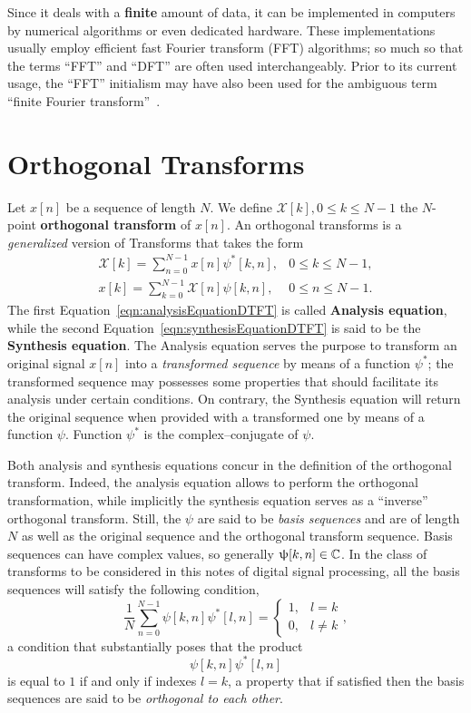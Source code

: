 \documentclass[\documentfontsize, twocolumn]{\classname}
\begin{document}
Since it deals with a \textbf{finite} amount of data, it can be implemented in computers by numerical algorithms or even dedicated hardware. These implementations usually employ efficient fast Fourier transform (FFT) algorithms; so much so that the terms ``FFT'' and ``DFT'' are often used interchangeably. Prior to its current usage, the ``FFT'' initialism may have also been used for the ambiguous term ``finite Fourier transform''~\cite{bib:discreteFourierTransform}.

\section{Orthogonal Transforms}\label{sec:orthogonalTransforms}

Let $x[n]$ be a sequence of length $N$. We define $\mathcal X[k], 0 \leq k \leq N-1$ the $N$-point \textbf{orthogonal transform} of $x[n]$. An orthogonal transforms is a \emph{generalized} version of Transforms that takes the form
\begin{eqnarray}
    \mathcal X[k] = \sum_{n=0}^{N-1} x[n] \psi^*[k,n], & 0 \leq k \leq N-1, \\\label{eqn:analysisEquationDTFT}
    x[k] = \sum_{k=0}^{N-1} \mathcal X[n] \psi[k,n], & 0 \leq n \leq N-1. \label{eqn:synthesisEquationDTFT}
\end{eqnarray}
The first Equation~\ref{eqn:analysisEquationDTFT} is called \textbf{Analysis equation}, while the second Equation~\ref{eqn:synthesisEquationDTFT} is said to be the \textbf{Synthesis equation}. The Analysis equation serves the purpose to transform an original signal $x[n]$ into a \emph{transformed sequence} by means of a function $\psi^*$; the transformed sequence may possesses some properties that should facilitate its analysis under certain conditions. On contrary, the Synthesis equation will return the original sequence when provided with a transformed one by means of a function $\psi$. Function $\psi^*$ is the complex--conjugate of $\psi$.

Both analysis and synthesis equations concur in the definition of the orthogonal transform. Indeed, the analysis equation allows to perform the orthogonal transformation, while implicitly the synthesis equation serves as a ``inverse'' orthogonal transform. Still, the $\psi$ are said to be \emph{basis sequences} and are of length $N$ as well as the original sequence and the orthogonal transform sequence. Basis sequences can have complex values, so generally $\uppsi[k, n] \in \mathbb C$. In the class of transforms to be considered in this notes of digital signal processing, all the basis sequences will satisfy the following condition,
\begin{equation}\label{eqn:orthogonalTransformsOrthogonalityCondition}
    \frac 1 N \sum_{n=0}^{N-1} \psi[k,n]\psi^*[l,n] = \left\{\begin{array}{ll}1, & l = k\\ 0, & l \neq k\end{array}\right.,
\end{equation}
a condition that substantially poses that the product \[\psi[k,n]\psi^*[l,n]\] is equal to $1$ if and only if indexes $l = k$, a property that if satisfied then the basis sequences are said to be \emph{orthogonal to each other}.
\end{document}
